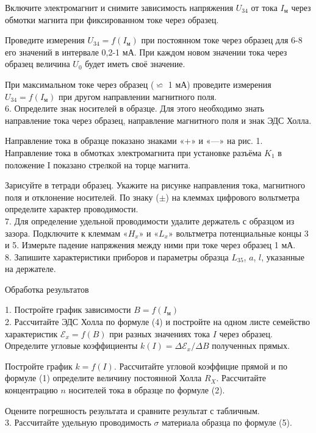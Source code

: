    Включите электромагнит и снимите зависимость напряжения $U_{34}$ от тока $I_{\text{м}}$ через обмотки магнита при фиксированном токе через образец.
   
   Проведите измерения $U_{34} = f(I_{\text{м}})$ при постоянном токе через образец для 6-8 его значений в интервале 0,2-1 мА. При каждом новом значении тока через образец величина $U_0$ будет иметь своё значение.
   
   При максимальном токе через образец ($\backsimeq$ 1 мА) проведите измерения $U_{34} = f(I_{\text{м}})$ при другом направлении магнитного поля.\\
 6. Определите знак носителей в образце. Для этого необходимо знать направление тока через образец, направление магнитного поля и знак ЭДС Холла.
   
   Направление тока в образце показано знаками «+» и «—» на рис. 1. Направление тока в обмотках электромагнита при установке разъёма $K_1$ в положение I показано стрелкой на торце магнита.
   
   Зарисуйте в тетради образец. Укажите на рисунке направления тока, магнитного поля и отклонение носителей. По знаку ($\pm$) на клеммах цифрового вольтметра определите характер проводимости.\\
 7. Для определение удельной проводимости удалите держатель с образцом из зазора. Подключите к клеммам «$H_x$» и «$L_x$» вольтметра потенциальные концы 3 и 5. Измерьте падение напряжения между ними при токе через образец 1 мА.\\
 8. Запишите характеристики приборов и параметры образца $L_{35}$, $a$, $l$, указанные на держателе.\\
 \begin{center}
  Обработка результатов
\end{center}
1. Постройте график зависимости $B = f(I_{\text{м}})$\\
 2. Рассчитайте ЭДС Холла по формуле (4) и постройте на одном листе семейство характеристик $\mathscr{E}_x = f(B)$ при разных значениях тока $I$ через образец. Определите угловые коэффициенты $k(I) = {\Delta{\mathscr{E}_x}}/{\Delta{B}}$ полученных прямых. 
 
Постройте график $k = f(I)$. Рассчитайте угловой коэффицие прямой и по формуле (1) определите величину постоянной Холла $R_{X}$. Рассчитайте концентрацию $n$ носителей тока в образце по формуле (2).
   
   Оцените погрешность результата и сравните результат с табличным.\\
 3. Рассчитайте удельную проводимость $\sigma$ материала образца по формуле (5). 
 

